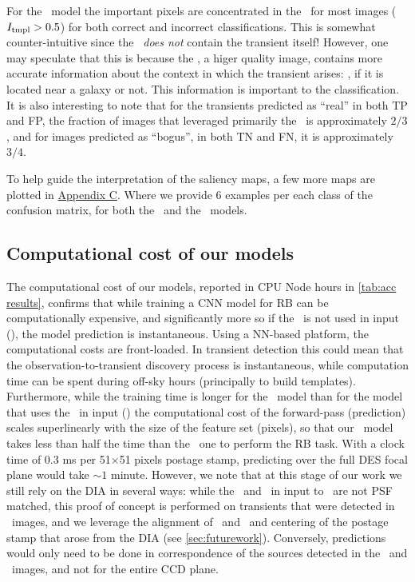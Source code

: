 For the \nodia\ model the important pixels are concentrated in the \temp\  for most images ($I_\mathrm{tmpl} > 0.5$) for both correct and incorrect classifications.
This is somewhat counter-intuitive since the \temp\ {\it does not} contain the transient itself! However, one may speculate that this is because the \temp, a higer quality image, contains more accurate information about the context in which the transient arises: \eg, if it is located near a galaxy or not. This information is important to the classification. It is also interesting to note that for the transients predicted as ``real'' in both TP and FP, the fraction of images that leveraged primarily the \temp\ is approximately $2/3$, and for images predicted as ``bogus'', in both TN and FN, it is approximately $3/4$.

To help guide the interpretation of the saliency maps, a few more maps are plotted in \hyperref[sec:appendixc]{Appendix C}. Where we provide 6 examples per each class of the confusion matrix, for both the \diabased\ and the \nodia\ models. 

\subsection{Computational cost of our models}\label{sec:computationcost}
The computational cost of our models, reported in CPU Node hours in \autoref{tab:acc results}, confirms that while training a CNN model for RB can be computationally expensive, and significantly more so if the \diff\ is not used in input (\nodia), the model prediction is instantaneous. Using a NN-based platform, the computational costs are front-loaded. In transient detection this could mean that the observation-to-transient discovery process is instantaneous, while computation time can be spent during off-sky hours (principally to build templates). Furthermore, while the training time is longer for the \nodia\ model than for the model that uses the \diff\ in input (\diabased) the computational cost of the forward-pass (prediction) scales superlinearly with the size of the feature set (pixels), so that our \nodia\ model takes less than half the time than the \diabased\ one to perform the RB task. With a clock time of 0.3 ms per 51$\times$51 pixels postage stamp, predicting over the full DES focal plane would take $\sim 1$ minute. However, we note that at this stage of our work we still rely on the DIA in several ways: while the \temp\ and \search\ in input to \nodia\ are not PSF matched, this proof of concept is performed on transients that were detected in \diff\ images, and we leverage the alignment of \temp\ and \search\ and centering of the postage stamp that arose from the DIA (see \autoref{sec:futurework}). Conversely, predictions would only need to be done in correspondence of the sources detected in the \temp\ and \search\ images, and not for the entire CCD plane.





